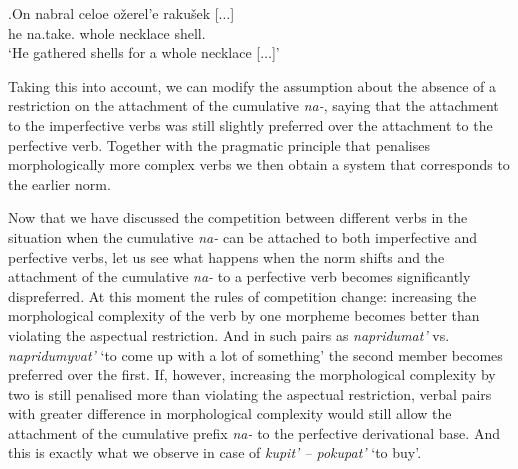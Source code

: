 \exg.\label{ex:nabrat}On nabral celoe o\v{z}erel'e raku\v{s}ek [$\ldots$]\\
he na.take. whole necklace shell.\\
\trans `He gathered shells for a whole necklace [$\ldots$]'\\

Taking this into account, we can modify the assumption about the absence of a restriction on the attachment of the cumulative \textit{na-}, saying that the attachment to the imperfective verbs was still slightly preferred over the attachment to the perfective verb. Together with the pragmatic principle that penalises morphologically more complex verbs we then obtain a system that corresponds to the earlier norm. 

Now that we have discussed the competition between different verbs in the situation when the cumulative \textit{na-} can be attached to both imperfective and perfective verbs, let us see what happens when the norm shifts and the attachment of the cumulative \textit{na-} to a perfective verb becomes significantly dispreferred. At this moment the rules of competition change: increasing the morphological complexity of the verb by one morpheme becomes better than violating the aspectual restriction. And in such pairs as \textit{napridumat'} vs. \textit{napridumyvat'} `to come up with a lot of something' the second member becomes preferred over the first. If, however, increasing the morphological complexity by two is still penalised more than violating the aspectual restriction, verbal pairs with greater difference in morphological complexity would still allow the attachment of the cumulative prefix \textit{na-} to the perfective derivational base. And this is exactly what we observe in case of \textit{kupit' -- pokupat'} `to buy'.


